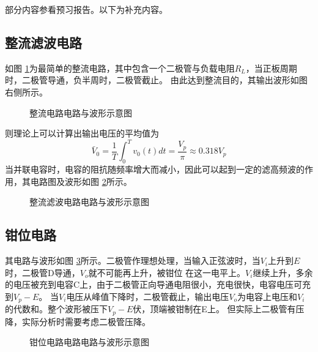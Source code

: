 \documentclass[a4paper,11pt,UTF8]{ctexart}
\begin{document}
部分内容参看预习报告。以下为补充内容。

\subsection{整流滤波电路}
如图 \ref{fig:SVCsim}为最简单的整流电路，其中包含一个二极管与负载电阻$R_L$，当正板周期时，二极管导通，负半周时，二极管截止。
由此达到整流目的，其输出波形如图右侧所示。
\begin{figure}[htbp]
  \centering
  \caption{整流电路电路与波形示意图}
  \label{fig:SVCsim}
  \end{figure}
则理论上可以计算出输出电压的平均值为
\begin{equation}
  \bar{V}_0=\frac{1}{T}\int_0^Tv_0(t)dt=\frac{V_p}{\pi}\approx0.318V_p
\label{eqa:avgV_SVC}
\end{equation}
当并联电容时，电容的阻抗随频率增大而减小，因此可以起到一定的滤高频波的作用，其电路图及波形如图 \ref{fig:SVCcom}所示。
\begin{figure}[htbp]
  \centering
  \caption{整流滤波电路电路与波形示意图}
  \label{fig:SVCcom}
  \end{figure}

\subsection{钳位电路}
其电路与波形如图 \ref{fig:clamper}所示。二极管作理想处理，当输入正弦波时，当$V_i$上升到$E$时，二极管D导通，$V_o$就不可能再上升，被钳位
在这一电平上。$V_i$继续上升，多余的电压被充到电容C上，由于二极管正向导通电阻很小，充电很快，电容电压可充到$V_p-E$。
当$V_i$电压从峰值下降时，二极管截止，输出电压$V_o$为电容上电压和$V_i$的代数和。整个波形被压下$V_p-E$伏，顶端被钳制在E上。
但实际上二极管有压降，实际分析时需要考虑二极管压降。
\begin{figure}[htbp]
  \centering
  \caption{钳位电路电路电路与波形示意图}
  \label{fig:clamper}
  \end{figure}
\end{document}
